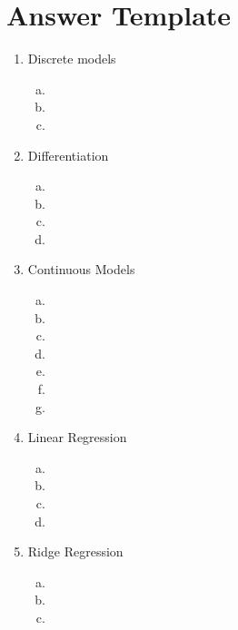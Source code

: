 \documentclass[12pt,twoside]{article}
\begin{document}
	\section{Answer Template}
	\begin{enumerate}[1)]
		\item Discrete models
		
		\begin{enumerate}[a)]
			\addtocounter{enumii}{2} %
			\item 
			\item
			\item 
		\end{enumerate}
		
		
		\item Differentiation
		
		\begin{enumerate}[a)]
			\item 
			\item
			\addtocounter{enumii}{1} 
			\item 
			\item
		\end{enumerate}
		
		
		\item Continuous Models
		
		\begin{enumerate}[a)]
			\item 
			\item
			\item 
			\item 
			\item
			\item 
			\item 
		\end{enumerate}
		
		\item Linear Regression
		
		
		\begin{enumerate}[a)]
			\item 
			\item
			\item 
			\item 
		\end{enumerate}
		
		\item Ridge Regression
		
		
		\begin{enumerate}[a)]
			\item 
			\item
			\item 
			

\end{enumerate}
\end{enumerate}
\end{document}
